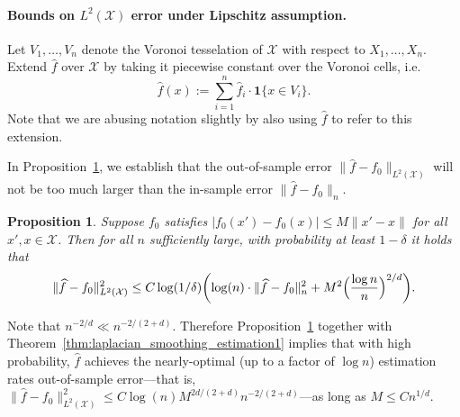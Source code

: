 \documentclass[twoside]{article}
\newcommand{\1}{\mathbf{1}}
\newcommand{\Xset}{\mathcal{X}}
\newcommand{\Leb}{L}
\newcommand{\mc}[1]{\mathcal{#1}}
\newcommand{\wh}[1]{\widehat{#1}}
\newtheorem{proposition}{Proposition}
\theoremstyle{definition}
\theoremstyle{remark}
\begin{document}
\paragraph{Bounds on $\Leb^2(\Xset)$ error under Lipschitz assumption.}
Let $V_1,\ldots,V_n$ denote the Voronoi tesselation of $\Xset$ with respect to $X_1,\ldots,X_n$. Extend $\wh{f}$ over $\Xset$ by taking it piecewise constant over the Voronoi cells, i.e.
\begin{equation*}
\wh{f}(x) := \sum_{i = 1}^{n} \wh{f}_i \cdot \1\{x \in V_i\}.
\end{equation*}
Note that we are abusing notation slightly by also using $\wh{f}$ to refer to this extension. 

In Proposition~\ref{prop:out_of_sample_error}, we establish that the out-of-sample error $\|\wh{f} - f_0\|_{\Leb^2(\Xset)}$ will not be too much larger than the in-sample error $\|\wh{f} - f_0\|_n$.
\begin{proposition}
	\label{prop:out_of_sample_error}
	Suppose $f_0$ satisfies $|f_0(x') - f_0(x)| \leq M \|x' - x\|$ for all $x',x \in \mc{X}$. Then for all $n$ sufficiently large, with probability at least $1 - \delta$ it holds that
	\begin{equation*}
	\|\wh{f} - f_0\|_{\Leb^2(\Xset)}^2 \leq C \log(1/\delta) \biggl(\log(n)\cdot \|\wh{f} - f_0\|_n^2 + M^2\Bigl(\frac{\log n}{n}\Bigr)^{2/d}\biggr).
	\end{equation*}
\end{proposition}
Note that $n^{-2/d} \ll n^{-2/(2 +d)}$. Therefore Proposition~\ref{prop:out_of_sample_error} together with Theorem~\ref{thm:laplacian_smoothing_estimation1} implies that with high probability, $\wh{f}$ achieves the nearly-optimal (up to a factor of $\log n$) estimation rates out-of-sample error---that is, $\|\wh{f} - f_0\|_{\Leb^2(\Xset)}^2 \leq C \log(n) M^{2d/(2 + d)}n^{-2/(2+d)}$---as long as $M \leq Cn^{1/d}$.
\end{document}
